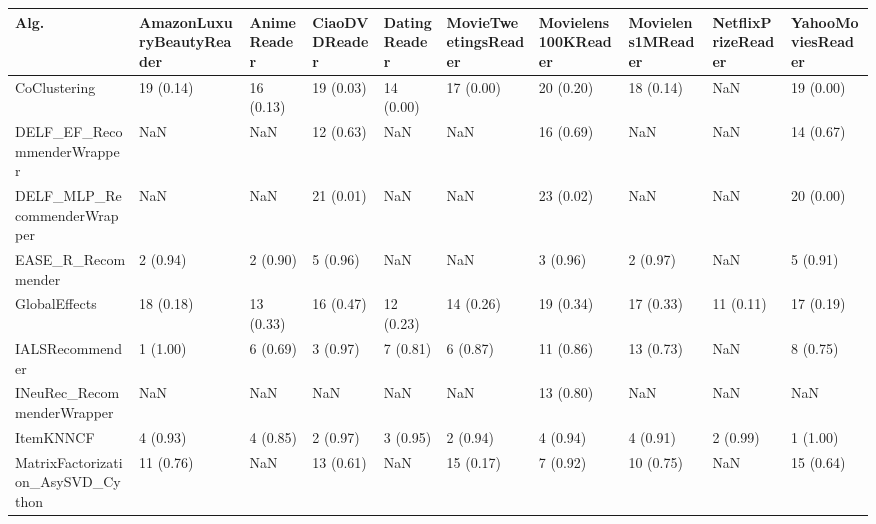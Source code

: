 \begin{tabular}{llllllllll}
\toprule
                               Alg. & AmazonLuxuryBeautyReader & AnimeReader & CiaoDVDReader & DatingReader & MovieTweetingsReader & Movielens100KReader & Movielens1MReader & NetflixPrizeReader & YahooMoviesReader \\
\midrule
                       CoClustering &                19 (0.14) &   16 (0.13) &     19 (0.03) &    14 (0.00) &            17 (0.00) &           20 (0.20) &         18 (0.14) &                NaN &         19 (0.00) \\
         DELF\_EF\_RecommenderWrapper &                      NaN &         NaN &     12 (0.63) &          NaN &                  NaN &           16 (0.69) &               NaN &                NaN &         14 (0.67) \\
        DELF\_MLP\_RecommenderWrapper &                      NaN &         NaN &     21 (0.01) &          NaN &                  NaN &           23 (0.02) &               NaN &                NaN &         20 (0.00) \\
                 EASE\_R\_Recommender &                 2 (0.94) &    2 (0.90) &      5 (0.96) &          NaN &                  NaN &            3 (0.96) &          2 (0.97) &                NaN &          5 (0.91) \\
                      GlobalEffects &                18 (0.18) &   13 (0.33) &     16 (0.47) &    12 (0.23) &            14 (0.26) &           19 (0.34) &         17 (0.33) &          11 (0.11) &         17 (0.19) \\
                    IALSRecommender &                 1 (1.00) &    6 (0.69) &      3 (0.97) &     7 (0.81) &             6 (0.87) &           11 (0.86) &         13 (0.73) &                NaN &          8 (0.75) \\
         INeuRec\_RecommenderWrapper &                      NaN &         NaN &           NaN &          NaN &                  NaN &           13 (0.80) &               NaN &                NaN &               NaN \\
                          ItemKNNCF &                 4 (0.93) &    4 (0.85) &      2 (0.97) &     3 (0.95) &             2 (0.94) &            4 (0.94) &          4 (0.91) &           2 (0.99) &          1 (1.00) \\
  MatrixFactorization\_AsySVD\_Cython &                11 (0.76) &         NaN &     13 (0.61) &          NaN &            15 (0.17) &            7 (0.92) &         10 (0.75) &                NaN &         15 (0.64) \\

\end{tabular}
